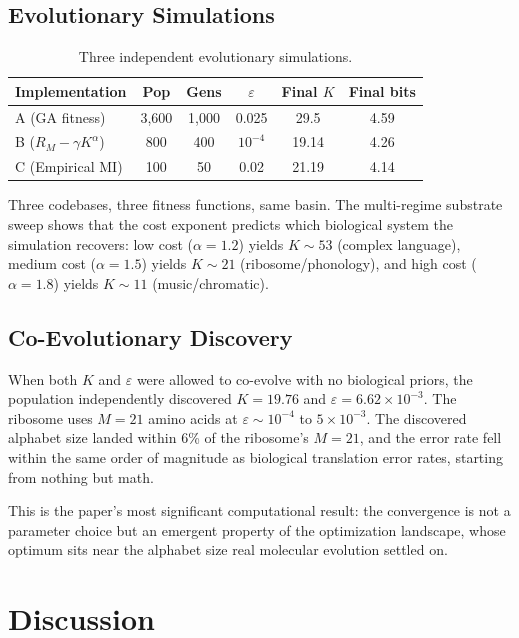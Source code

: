 \documentclass[11pt]{article}
\begin{document}
\subsection{Evolutionary Simulations}

\begin{table}[ht]
\centering
\caption{Three independent evolutionary simulations.}
\label{tab:evosim}
\begin{tabular}{lccccc}
\toprule
Implementation & Pop & Gens & $\varepsilon$ & Final $K$ & Final bits \\
\midrule
A (GA fitness) & 3,600 & 1,000 & 0.025 & 29.5 & 4.59 \\
B ($R_M - \gamma K^\alpha$) & 800 & 400 & $10^{-4}$ & 19.14 & 4.26 \\
C (Empirical MI) & 100 & 50 & 0.02 & 21.19 & 4.14 \\
\bottomrule
\end{tabular}
\end{table}

Three codebases, three fitness functions, same basin. The multi-regime substrate sweep shows that the cost exponent predicts which biological system the simulation recovers: low cost ($\alpha = 1.2$) yields $K \sim 53$ (complex language), medium cost ($\alpha = 1.5$) yields $K \sim 21$ (ribosome/phonology), and high cost ($\alpha = 1.8$) yields $K \sim 11$ (music/chromatic).

\subsection{Co-Evolutionary Discovery}

When both $K$ and $\varepsilon$ were allowed to co-evolve with no biological priors, the population independently discovered $K = 19.76$ and $\varepsilon = 6.62 \times 10^{-3}$. The ribosome uses $M = 21$ amino acids at $\varepsilon \sim 10^{-4}$ to $5 \times 10^{-3}$. The discovered alphabet size landed within 6\% of the ribosome's $M = 21$, and the error rate fell within the same order of magnitude as biological translation error rates, starting from nothing but math.

This is the paper's most significant computational result: the convergence is not a parameter choice but an emergent property of the optimization landscape, whose optimum sits near the alphabet size real molecular evolution settled on.

\section{Discussion}
\end{document}

